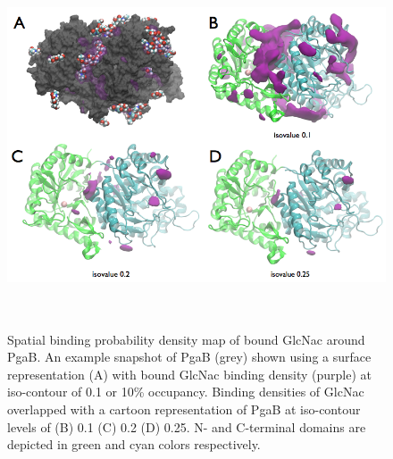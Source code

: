 \begin{figure}[pgab_density]
\centering
\includegraphics[height=4.25in, width=6in]{figures/results4/figure_pgab_density.png}
\caption[NAG binding density]{Spatial binding probability density map of bound GlcNac around PgaB. An example snapshot of PgaB (grey) shown using a surface representation (A) with bound GlcNac binding density  (purple) at iso-contour of 0.1 or 10\% occupancy. Binding densities of GlcNac overlapped with a cartoon representation of PgaB at iso-contour levels of (B) 0.1 (C) 0.2 (D) 0.25. N- and C-terminal domains are depicted in green and cyan colors respectively.}
\label{fig:pgab_density}
\end{figure}

